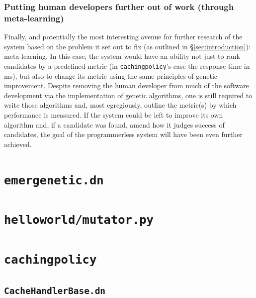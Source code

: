 \documentclass[compsoc,12pt,a4paper]{IEEEtran}
\begin{document}
			\subsubsection{Putting human developers further out of work (through meta-learning)}
			
				Finally, and potentially the most interesting avenue for further research of the system based on the problem it set out to fix (as outlined in \S \ref{sec:introduction}): meta-learning.\cite{meta} In this case, the system would have an ability not just to rank candidates by a predefined metric (in \lstinline|cachingpolicy|'s case the response time in ms), but also to change its metric using the same principles of genetic improvement. Despite removing the human developer from much of the software development via the implementation of genetic algorithms, one is still required to write those algorithms and, most egregiously, outline the metric(s) by which performance is measured. If the system could be left to improve its own algorithm and, if a candidate was found, amend how it judges success of candidates, the goal of the programmerless system will have been even further achieved.
		
	\newpage
	
	
		
	
	\newpage
	
	\appendices
	
		\section{\lstinline|emergenetic.dn|}
		\label{appendix:emergen}
		
	
		\newpage
		
		\section{\lstinline|helloworld/mutator.py|}
		\label{appendix:helloworld}
		
			
		\newpage
		
		\section{\lstinline|cachingpolicy|}
			\subsection{\lstinline|CacheHandlerBase.dn|}
			\label{appendix:base}
			
			
\end{document}
